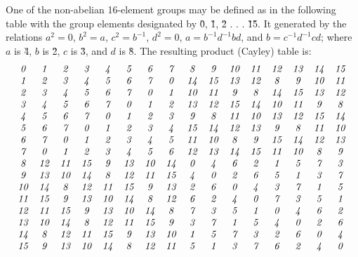 \documentclass[12pt]{article}
\begin{document}
 One of the non-abelian 16-element groups may be defined as in the
following table with the group elements designated by \G0, \G1,
\G2 . . . \G1\G5.  It generated 
by the relations $a^2 = 0$, $b^2 = a$, $c^2 = b^{-1}$, $d^2 = 0$,
$a = b^{-1}d^{-1}bd$, and $b=c^{-1}d^{-1}cd$; where
$a$ is \G4, $b$ is \G2, $c$ is \G3, and
$d$ is \G8.  The resulting product (Cayley) table is:
\begin{displaymath}
\begin{array}{cccccccccccccccc}
\G0 &\G1 &\G2 &\G3 &\G4 &\G5 &\G6 &\G7 &\G8 &\G9 &\G1\G0 &\G1\G1 &\G1\G2 &\G1\G3 &\G1\G4 &\G1\G5 \\
\G1 &\G2 &\G3 &\G4 &\G5 &\G6 &\G7 &\G0 &\G1\G4 &\G1\G5 &\G1\G3 &\G1\G2 &\G8 &\G9 &\G1\G0 &\G1\G1 \\
\G2 &\G3 &\G4 &\G5 &\G6 &\G7 &\G0 &\G1 &\G1\G0 &\G1\G1 &\G9 &\G8 &\G1\G4 &\G1\G5 &\G1\G3 &\G1\G2 \\
\G3 &\G4 &\G5 &\G6 &\G7 &\G0 &\G1 &\G2 &\G1\G3 &\G1\G2 &\G1\G5 &\G1\G4 &\G1\G0 &\G1\G1 &\G9 &\G8 \\
\G4 &\G5 &\G6 &\G7 &\G0 &\G1 &\G2 &\G3 &\G9 &\G8 &\G1\G1 &\G1\G0 &\G1\G3 &\G1\G2 &\G1\G5 &\G1\G4 \\
\G5 &\G6 &\G7 &\G0 &\G1 &\G2 &\G3 &\G4 &\G1\G5 &\G1\G4 &\G1\G2 &\G1\G3 &\G9 &\G8 &\G1\G1 &\G1\G0 \\
\G6 &\G7 &\G0 &\G1 &\G2 &\G3 &\G4 &\G5 &\G1\G1 &\G1\G0 &\G8 &\G9 &\G1\G5 &\G1\G4 &\G1\G2 &\G1\G3 \\
\G7 &\G0 &\G1 &\G2 &\G3 &\G4 &\G5 &\G6 &\G1\G2 &\G1\G3 &\G1\G4 &\G1\G5 &\G1\G1 &\G1\G0 &\G8 &\G9 \\
\G8 &\G1\G2 &\G1\G1 &\G1\G5 &\G9 &\G1\G3 &\G1\G0 &\G1\G4 &\G0 &\G4 &\G6 &\G2 &\G1 &\G5 &\G7 &\G3 \\
\G9 &\G1\G3 &\G1\G0 &\G1\G4 &\G8 &\G1\G2 &\G1\G1 &\G1\G5 &\G4 &\G0 &\G2 &\G6 &\G5 &\G1 &\G3 &\G7 \\
\G1\G0 &\G1\G4 &\G8 &\G1\G2 &\G1\G1 &\G1\G5 &\G9 &\G1\G3 &\G2 &\G6 &\G0 &\G4 &\G3 &\G7 &\G1 &\G5 \\
\G1\G1 &\G1\G5 &\G9 &\G1\G3 &\G1\G0 &\G1\G4 &\G8 &\G1\G2 &\G6 &\G2 &\G4 &\G0 &\G7 &\G3 &\G5 &\G1 \\
\G1\G2 &\G1\G1 &\G1\G5 &\G9 &\G1\G3 &\G1\G0 &\G1\G4 &\G8 &\G7 &\G3 &\G5 &\G1 &\G0 &\G4 &\G6 &\G2 \\
\G1\G3 &\G1\G0 &\G1\G4 &\G8 &\G1\G2 &\G1\G1 &\G1\G5 &\G9 &\G3 &\G7 &\G1 &\G5 &\G4 &\G0 &\G2 &\G6 \\
\G1\G4 &\G8 &\G1\G2 &\G1\G1 &\G1\G5 &\G9 &\G1\G3 &\G1\G0 &\G1 &\G5 &\G7 &\G3 &\G2 &\G6 &\G0 &\G4 \\
\G1\G5 &\G9 &\G1\G3 &\G1\G0 &\G1\G4 &\G8 &\G1\G2 &\G1\G1 &\G5 &\G1 &\G3 &\G7 &\G6 &\G2 &\G4 &\G0
\end{array}
\end{displaymath}
\end{document}
